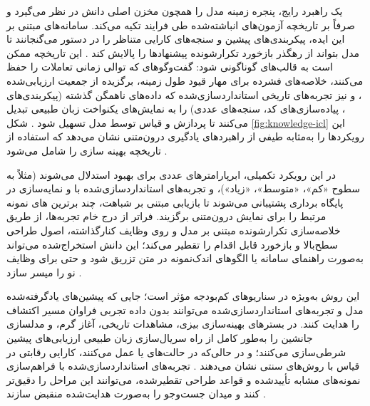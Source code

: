 یک راهبرد رایج، پنجره زمینه مدل را همچون مخزن اصلی دانش در نظر می‌گیرد و صرفاً بر تاریخچه آزمون‌های انباشته‌شده طی فرایند  تکیه می‌کند. سامانه‌های مبتنی بر این ایده، پیکربندی‌های پیشین و سنجه‌های کارایی متناظر را در دستور می‌گنجانند تا مدل بتواند از رهگذر بازخورد تکرارشونده پیشنهادها را پالایش کند \cite{zhang2023usingLLMforHPO, zheng2023GENIUS, liu2024LLAMBO}. این تاریخچه ممکن است به قالب‌های گوناگونی  شود: گفت‌وگوهای  که توالی زمانی تعاملات را حفظ می‌کنند، خلاصه‌های فشرده برای مهار قیود طول زمینه،  برگزیده از جمعیت ارزیابی‌شده \cite{zhang2023usingLLMforHPO, chen2023Evoprompting}، و نیز تجربه‌های تاریخی استانداردسازی‌شده که داده‌های ناهمگن گذشته (پیکربندی‌های ، پیاده‌سازی‌های کد، سنجه‌های عددی) را به نمایش‌های یکنواخت زبان طبیعی تبدیل می‌کنند تا پردازش و قیاس توسط مدل تسهیل شود \cite{zhang-etal-2024-MLCopilot}. شکل \ref{fig:knowledge-icl} این رویکردها را به‌مثابه طیفی از راهبردهای یادگیری درون‌متنی نشان می‌دهد که استفاده از تاریخچه بهینه سازی را شامل می‌شود \cite{liu2025agenthpo}.

در این رویکرد تکمیلی، ابرپارامترهای عددی برای بهبود استدلال  می‌شوند (مثلاً به سطوح «کم»، «متوسط»، «زیاد»)، و تجربه‌های استانداردسازی‌شده با  و نمایه‌سازی در پایگاه برداری پشتیبانی می‌شوند تا بازیابی مبتنی بر شباهت، چند برترین های نمونه مرتبط را برای نمایش درون‌متنی برگزیند. فراتر از درج خام تجربه‌ها،  از طریق خلاصه‌سازی تکرارشونده مبتنی بر مدل و  روی وظایف کنارگذاشته، اصول طراحی سطح‌بالا و بازخورد قابل اقدام را تقطیر می‌کند؛ این دانش استخراج‌شده می‌تواند به‌صورت راهنمای سامانه یا الگوهای اندک‌نمونه در متن تزریق شود و حتی  برای وظایف نو را میسر سازد \cite{zhang-etal-2024-MLCopilot}.

این روش به‌ویژه در سناریوهای کم‌بودجه مؤثر است؛ جایی که پیشین‌های یادگرفته‌شده مدل و تجربه‌های استانداردسازی‌شده می‌توانند بدون داده تجربی فراوان مسیر اکتشاف را هدایت کنند. در بسترهای بهینه‌سازی بیزی، مشاهدات تاریخی، آغاز گرم،  و مدلسازی جانشین را به‌طور کامل از راه سریال‌سازی زبان طبیعی ارزیابی‌های پیشین شرطی‌سازی می‌کنند؛ و در حالی‌که در حالت‌های  یا  عمل می‌کنند، کارایی رقابتی در قیاس با روش‌های سنتی نشان می‌دهند \cite{liu2024LLAMBO}. تجربه‌های استانداردسازی‌شده با فراهم‌سازی نمونه‌های مشابه تأییدشده و قواعد طراحی تقطیرشده، می‌توانند این مراحل را دقیق‌تر  کنند و میدان جست‌وجو را به‌صورت هدایت‌شده منقبض سازند \cite{zhang-etal-2024-MLCopilot}.

